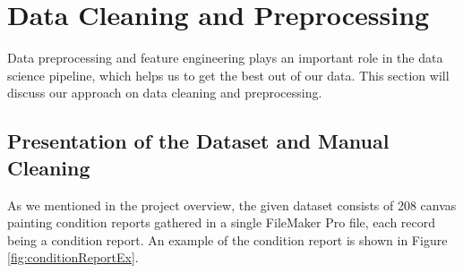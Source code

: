 \documentclass[11pt, oneside]{article}
\begin{document}
\section{Data Cleaning and Preprocessing}
Data preprocessing and feature engineering plays an important role in the data science pipeline, which helps us to get the best out of our data. This section will discuss our approach on data cleaning and preprocessing.

\subsection{Presentation of the Dataset and Manual Cleaning}
As we mentioned in the project overview, the given dataset consists of 208 canvas painting condition reports gathered in a single FileMaker Pro file, each record being a condition report. An example of the condition report is shown in Figure \ref{fig:conditionReportEx}.
\end{document}
